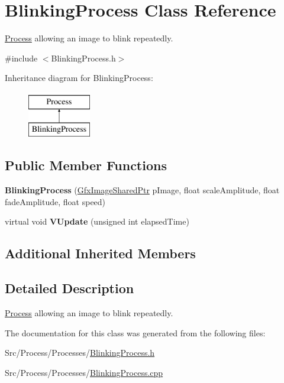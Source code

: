 \hypertarget{classBlinkingProcess}{\section{Blinking\-Process Class Reference}
\label{classBlinkingProcess}
}


\hyperlink{classProcess}{Process} allowing an image to blink repeatedly.  




{\ttfamily \#include $<$Blinking\-Process.\-h$>$}

Inheritance diagram for Blinking\-Process\-:\begin{figure}[H]
\begin{center}
\leavevmode
\includegraphics[height=2.000000cm]{classBlinkingProcess}
\end{center}
\end{figure}
\subsection*{Public Member Functions}
\begin{DoxyCompactItemize}
\item 
\hypertarget{classBlinkingProcess_a513a73d5c67c889fc8c8b955dbd44525}{{\bfseries Blinking\-Process} (\hyperlink{GfxImage_8h_a42b2baf6110731a1a358d365e303e086}{Gfx\-Image\-Shared\-Ptr} p\-Image, float scale\-Amplitude, float fade\-Amplitude, float speed)}\label{classBlinkingProcess_a513a73d5c67c889fc8c8b955dbd44525}

\item 
\hypertarget{classBlinkingProcess_a49aa71d9b95a968bdc5cfa8e512e1ff8}{virtual void {\bfseries V\-Update} (unsigned int elapsed\-Time)}\label{classBlinkingProcess_a49aa71d9b95a968bdc5cfa8e512e1ff8}

\end{DoxyCompactItemize}
\subsection*{Additional Inherited Members}


\subsection{Detailed Description}
\hyperlink{classProcess}{Process} allowing an image to blink repeatedly. 

The documentation for this class was generated from the following files\-:\begin{DoxyCompactItemize}
\item 
Src/\-Process/\-Processes/\hyperlink{BlinkingProcess_8h}{Blinking\-Process.\-h}\item 
Src/\-Process/\-Processes/\hyperlink{BlinkingProcess_8cpp}{Blinking\-Process.\-cpp}\end{DoxyCompactItemize}
